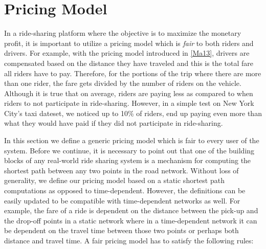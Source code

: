 \section{Pricing Model}
\label{sec:pricing}


In a ride-sharing platform where the objective is to maximize the monetary profit, it is important to utilize a pricing model which is \textit{fair} to both riders and drivers. For example, with the pricing model introduced in \cref{Ma13}, drivers are compensated based on the distance they have traveled and this is the total fare all riders have to pay. Therefore, for the portions of the trip where there are more than one rider, the fare gets divided by the number of riders on the vehicle. Although it is true that on average, riders are paying less as compared to when riders to not participate in ride-sharing. However, in a simple test on New York City's taxi dateset, we noticed up to 10\% of riders, end up paying even more than what they would have paid if they did not participate in ride-sharing.

In this section we define a generic pricing model which is fair to every user  of the system. Before we continue, it is necessary to point out that one of the building blocks of any real-world ride sharing system is a mechanism for computing the shortest path between any two points in the road network. Without loss of generality, we define our pricing model based on a static shortest path computations as opposed to time-dependent. However, the definitions can be easily updated to be compatible with time-dependent networks as well. For example, the fare of a ride is dependent on the distance between the pick-up and the drop-off points in a static network where in a time-dependent network it can be dependent on the travel time between those two points or perhaps both distance and travel time. A fair pricing model has to satisfy the following rules:

